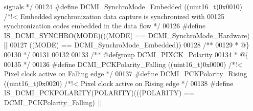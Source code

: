 \begin{DoxyCode}
{       signals */}
00124 \textcolor{preprocessor}{#}\textcolor{preprocessor}{define} \textcolor{preprocessor}{DCMI\_SynchroMode\_Embedded}    \textcolor{preprocessor}{(}\textcolor{preprocessor}{(}\textcolor{preprocessor}{uint16\_t}\textcolor{preprocessor}{)}0x0010\textcolor{preprocessor}{)} \textcolor{comment}{/*!< Embedded synchronization data capture is
       synchronized with }
00125 \textcolor{comment}{                                                             synchronization codes embedded in the
       data flow */}
00126 \textcolor{preprocessor}{#}\textcolor{preprocessor}{define} \textcolor{preprocessor}{IS\_DCMI\_SYNCHRO}\textcolor{preprocessor}{(}\textcolor{preprocessor}{MODE}\textcolor{preprocessor}{)}\textcolor{preprocessor}{(}\textcolor{preprocessor}{(}\textcolor{preprocessor}{(}\textcolor{preprocessor}{MODE}\textcolor{preprocessor}{)} \textcolor{preprocessor}{==} DCMI_SynchroMode_Hardware\textcolor{preprocessor}{)} \textcolor{preprocessor}{||}
00127                               \textcolor{preprocessor}{(}\textcolor{preprocessor}{(}\textcolor{preprocessor}{MODE}\textcolor{preprocessor}{)} \textcolor{preprocessor}{==} DCMI_SynchroMode_Embedded\textcolor{preprocessor}{)}\textcolor{preprocessor}{)}
00128 \textcolor{comment}{/**}
00129 \textcolor{comment}{  * @\}}
00130 \textcolor{comment}{  */}
00131 
00132 
00133 \textcolor{comment}{/** @defgroup DCMI\_PIXCK\_Polarity }
00134 \textcolor{comment}{  * @\{}
00135 \textcolor{comment}{  */}
00136 \textcolor{preprocessor}{#}\textcolor{preprocessor}{define} \textcolor{preprocessor}{DCMI\_PCKPolarity\_Falling}    \textcolor{preprocessor}{(}\textcolor{preprocessor}{(}\textcolor{preprocessor}{uint16\_t}\textcolor{preprocessor}{)}0x0000\textcolor{preprocessor}{)} \textcolor{comment}{/*!< Pixel clock active on Falling edge */}
00137 \textcolor{preprocessor}{#}\textcolor{preprocessor}{define} \textcolor{preprocessor}{DCMI\_PCKPolarity\_Rising}     \textcolor{preprocessor}{(}\textcolor{preprocessor}{(}\textcolor{preprocessor}{uint16\_t}\textcolor{preprocessor}{)}0x0020\textcolor{preprocessor}{)} \textcolor{comment}{/*!< Pixel clock active on Rising edge */}
00138 \textcolor{preprocessor}{#}\textcolor{preprocessor}{define} \textcolor{preprocessor}{IS\_DCMI\_PCKPOLARITY}\textcolor{preprocessor}{(}\textcolor{preprocessor}{POLARITY}\textcolor{preprocessor}{)}\textcolor{preprocessor}{(}\textcolor{preprocessor}{(}\textcolor{preprocessor}{(}\textcolor{preprocessor}{POLARITY}\textcolor{preprocessor}{)} \textcolor{preprocessor}{==} 
      DCMI_PCKPolarity_Falling\textcolor{preprocessor}{)} \textcolor{preprocessor}{||}

\end{DoxyCode}
